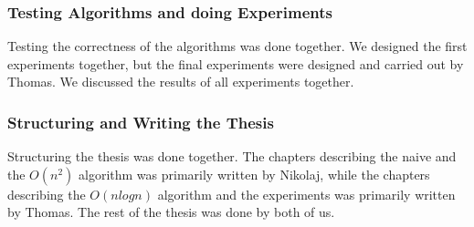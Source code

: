 \subsubsection{Testing Algorithms and doing Experiments}
Testing the correctness of the algorithms was done together. We designed the first experiments together, but the final experiments were designed and carried out by Thomas. We discussed the results of all experiments together.

\subsubsection{Structuring and Writing the Thesis}
Structuring the thesis was done together. The chapters describing the naive and the $O(n^2)$ algorithm was primarily written by Nikolaj, while the chapters describing the $O(nlogn)$ algorithm and the experiments was primarily written by Thomas. The rest of the thesis was done by both of us.




